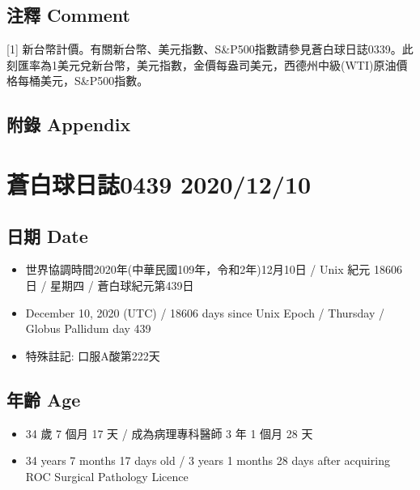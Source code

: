 \documentclass[a5paper, 10pt
]{book}
\providecommand{\tightlist}{%
  \setlength{\itemsep}{0pt}\setlength{\parskip}{0pt}}
\begin{document}
\hypertarget{ux6ce8ux91cb-comment-8}{%
\subsection{注釋 Comment}\label{ux6ce8ux91cb-comment-8}}

{[}1{]}
新台幣計價。有關新台幣、美元指數、S\&P500指數請參見蒼白球日誌0339。此刻匯率為1美元兌新台幣，美元指數，金價每盎司美元，西德州中級(WTI)原油價格每桶美元，S\&P500指數。

\hypertarget{ux9644ux9304-appendix-8}{%
\subsection{附錄 Appendix}\label{ux9644ux9304-appendix-8}}

\hypertarget{ux84bcux767dux7403ux65e5ux8a8c0439-20201210}{%
\section{蒼白球日誌0439
2020/12/10}\label{ux84bcux767dux7403ux65e5ux8a8c0439-20201210}}

\hypertarget{ux65e5ux671f-date-9}{%
\subsection{日期 Date}\label{ux65e5ux671f-date-9}}

\begin{itemize}
\tightlist
\item
  世界協調時間2020年(中華民國109年，令和2年)12月10日 / Unix 紀元 18606
  日 / 星期四 / 蒼白球紀元第439日
\item
  December 10, 2020 (UTC) / 18606 days since Unix Epoch / Thursday /
  Globus Pallidum day 439
\item
  特殊註記: 口服A酸第222天
\end{itemize}

\hypertarget{ux5e74ux9f61-age-9}{%
\subsection{年齡 Age}\label{ux5e74ux9f61-age-9}}

\begin{itemize}
\tightlist
\item
  34 歲 7 個月 17 天 / 成為病理專科醫師 3 年 1 個月 28 天
\item
  34 years 7 months 17 days old / 3 years 1 months 28 days after
  acquiring ROC Surgical Pathology Licence
\end{itemize}
\end{document}
